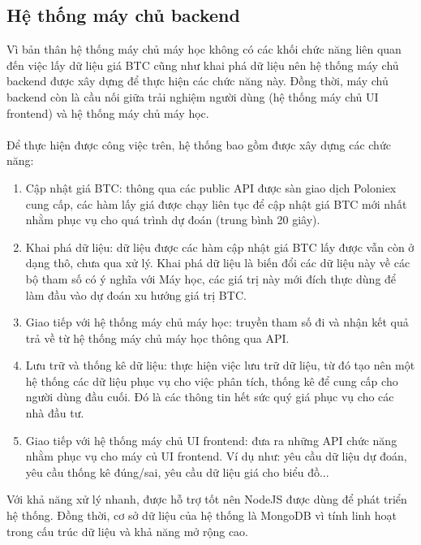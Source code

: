 \subsection{ Hệ thống máy chủ backend}
Vì bản thân hệ thống máy chủ máy học không có các khối chức năng liên quan đến 
việc lấy dữ liệu giá BTC cũng như khai phá dữ liệu nên hệ thống máy chủ backend 
được xây dựng để thực hiện các chức năng này. Đồng thời, máy chủ backend còn là 
cầu nối giữa trải nghiệm người dùng (hệ thống máy chủ UI frontend) và hệ thống 
máy chủ máy học.\\\\
Để thực hiện được công việc trên, hệ thống bao gồm được xây dựng các chức năng:\\
\begin{enumerate}
\item Cập nhật giá BTC: thông qua các public API được sàn giao dịch Poloniex 
cung cấp, các hàm lấy giá được chạy liên tục để cập nhật giá BTC mới nhất nhằm 
phục vụ cho quá trình dự đoán (trung bình 20 giây).
\item Khai phá dữ liệu: dữ liệu được các hàm cập nhật giá BTC lấy được vẫn 
còn ở dạng thô, chưa qua xử lý. Khai phá dữ liệu là biến đổi các dữ liệu này 
về các bộ tham số có ý nghĩa với Máy học, các giá trị này mới đích thực 
dùng để làm đầu vào dự đoán xu hướng giá trị BTC.
\item Giao tiếp với hệ thống máy chủ máy học: truyền tham số đi và nhận 
kết quả trả về từ hệ thống máy chủ máy học thông qua API.
\item Lưu trữ và thống kê dữ liệu: thực hiện việc lưu trữ dữ liệu, từ đó tạo 
nên một hệ thống các dữ liệu phục vụ cho việc phân tích, thống kê để cung cấp 
cho người dùng đầu cuối. Đó là các thông tin hết sức quý giá phục vụ cho các 
nhà đầu tư.
\item Giao tiếp với hệ thống máy chủ UI frontend: đưa ra những API chức năng 
nhằm phục vụ cho máy củ UI frontend. Ví dụ như: yêu cầu dữ liệu dự đoán, yêu 
cầu thống kê đúng/sai, yêu cầu dữ liệu giá cho biểu đồ...
\end{enumerate}
Với khả năng xử lý nhanh, được hỗ trợ tốt nên NodeJS được dùng để phát triển 
hệ thống. Đồng thời, cơ sở dữ liệu của hệ thống là MongoDB vì tính linh hoạt 
trong cấu trúc dữ liệu và khả năng mở rộng cao.\\\\
